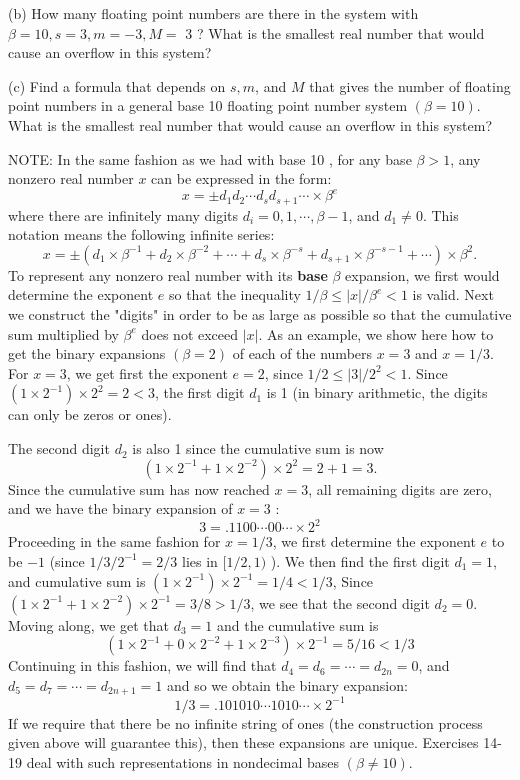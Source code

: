\documentclass[../main.tex]{subfiles}
\begin{document}
\begin{enumerate}
(b) How many floating point numbers are there in the system with $\beta=10, s=3, m=-3, M=$ 3 ? What is the smallest real number that would cause an overflow in this system?


(c) Find a formula that depends on $s, m$, and $M$ that gives the number of floating point numbers in a general base 10 floating point number system $(\beta=10)$. What is the smallest real number that would cause an overflow in this system?

NOTE: In the same fashion as we had with base 10 , for any base $\beta>1$, any nonzero real number $x$ can be expressed in the form:
$$
x=\pm d_{1} d_{2} \cdots d_{s} d_{s+1} \cdots \times \beta^{e}
$$
where there are infinitely many digits $d_{i}=0,1, \cdots, \beta-1$, and $d_{1} \neq 0$. This notation means the following infinite series:
$$
x=\pm\left(d_{1} \times \beta^{-1}+d_{2} \times \beta^{-2}+\cdots+d_{s} \times \beta^{-s}+d_{s+1} \times \beta^{-s-1}+\cdots\right) \times \beta^{2} .
$$
To represent any nonzero real number with its \textbf{base} $\beta$ expansion, we first would determine the exponent $e$ so that the inequality $1 / \beta \leq|x| / \beta^{e}<1$ is valid. Next we construct the "digits" in order to be as large as possible so that the cumulative sum multiplied by $\beta^{e}$ does not exceed $|x|$. As an example, we show here how to get the binary expansions $(\beta=2)$ of each of the numbers $x=3$ and $x=1 / 3$. For $x=3$, we get first the exponent $e=2$, since $1 / 2 \leq|3| / 2^{2}<1$. Since $\left(1 \times 2^{-1}\right) \times 2^{2}=2<3$, the first digit $d_{1}$ is 1 (in binary arithmetic, the digits can only be zeros or ones).

The second digit $d_{2}$ is also 1 since the cumulative sum is now
$$
\left(1 \times 2^{-1}+1 \times 2^{-2}\right) \times 2^{2}=2+1=3 .
$$
Since the cumulative sum has now reached $x=3$, all remaining digits are zero, and we have the binary expansion of $x=3$ :
$$
3=.1100 \cdots 00 \cdots \times 2^{2}
$$
Proceeding in the same fashion for $x=1 / 3$, we first determine the exponent $e$ to be $-1$ (since $1 / 3 / 2^{-1}=2 / 3$ lies in $[1 / 2,1)$ ). We then find the first digit $d_{1}=1$, and cumulative sum is $\left(1 \times 2^{-1}\right) \times 2^{-1}=1 / 4<1 / 3$, Since $\left(1 \times 2^{-1}+1 \times 2^{-2}\right) \times 2^{-1}=3 / 8>1 / 3$, we see that the second digit $d_{2}=0$. Moving along, we get that $d_{3}=1$ and the cumulative sum is
$$
\left(1 \times 2^{-1}+0 \times 2^{-2}+1 \times 2^{-3}\right) \times 2^{-1}=5 / 16<1 / 3
$$
Continuing in this fashion, we will find that $d_{4}=d_{6}=\cdots=d_{2 n}=0$, and $d_{5}=d_{7}=\cdots=d_{2 n+1}=1$ and so we obtain the binary expansion:
$$
1 / 3=.101010 \cdots 1010 \cdots \times 2^{-1}
$$
If we require that there be no infinite string of ones (the construction process given above will guarantee this), then these expansions are unique. Exercises 14-19 deal with such representations in nondecimal bases $(\beta \neq 10)$.


\end{enumerate}
\end{document}
